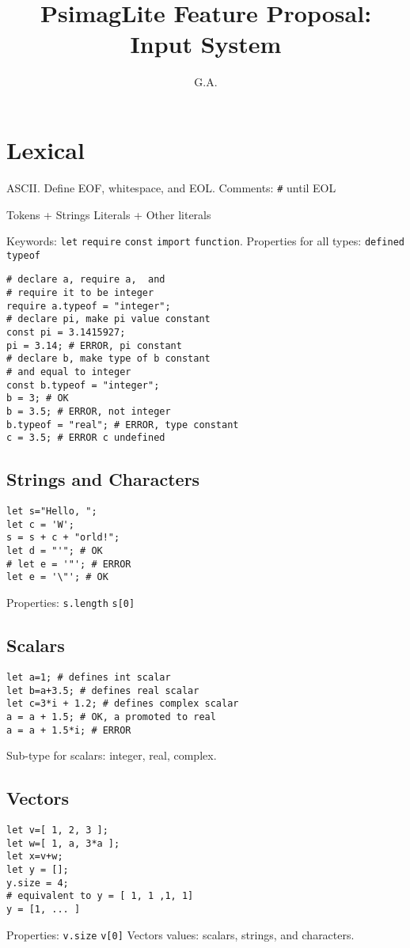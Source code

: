 \documentclass[twocolumn]{article}
\begin{document}
\title{PsimagLite Feature Proposal:
Input System}
\author{G.A.}
\maketitle

\section{Lexical}
ASCII.
Define EOF, whitespace, and EOL.
Comments: \verb!#! until EOL

Tokens + Strings Literals + Other literals

Keywords:
\verb!let! \verb!require! \verb!const! \verb!import! \verb!function!.
Properties for all types: \verb!defined! \verb!typeof!
\begin{verbatim}
# declare a, require a,  and
# require it to be integer
require a.typeof = "integer";
# declare pi, make pi value constant
const pi = 3.1415927;
pi = 3.14; # ERROR, pi constant
# declare b, make type of b constant 
# and equal to integer
const b.typeof = "integer"; 
b = 3; # OK
b = 3.5; # ERROR, not integer
b.typeof = "real"; # ERROR, type constant
c = 3.5; # ERROR c undefined
\end{verbatim}

\subsection{Strings and Characters} 
\begin{verbatim}
let s="Hello, ";
let c = 'W';
s = s + c + "orld!";
let d = "'"; # OK
# let e = '"'; # ERROR
let e = '\"'; # OK
\end{verbatim}
Properties: \verb!s.length! \verb!s[0]!

\subsection{Scalars} 
\begin{verbatim}
let a=1; # defines int scalar
let b=a+3.5; # defines real scalar
let c=3*i + 1.2; # defines complex scalar
a = a + 1.5; # OK, a promoted to real
a = a + 1.5*i; # ERROR
\end{verbatim}
Sub-type for scalars: integer, real, complex.

\subsection{Vectors} 
\begin{verbatim}
let v=[ 1, 2, 3 ];
let w=[ 1, a, 3*a ];
let x=v+w;
let y = [];
y.size = 4;
# equivalent to y = [ 1, 1 ,1, 1]
y = [1, ... ] 
\end{verbatim}
Properties: \verb!v.size! \verb!v[0]!
Vectors values: scalars, strings, and characters.
\end{document}
